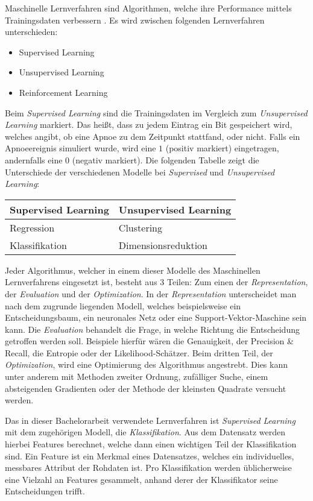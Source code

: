 Maschinelle Lernverfahren sind Algorithmen, welche ihre Performance mittels Trainingsdaten verbessern \cite{neumannMaschineLearningKIT2020}. 
Es wird zwischen folgenden Lernverfahren unterschieden:
\begin{itemize}
    \item Supervised Learning
    \item Unsupervised Learning
    \item Reinforcement Learning
\end{itemize}
Beim \textit{Supervised Learning} sind die Trainingsdaten im Vergleich zum \textit{Unsupervised Learning} markiert.
Das heißt, dass zu jedem Eintrag ein Bit gespeichert wird, welches angibt, ob eine Apnoe zu dem Zeitpunkt stattfand, oder nicht. 
Falls ein Apnoeereignis simuliert wurde, wird eine $1$ ({\glqq positiv markiert\grqq}) eingetragen, andernfalls eine $0$ ({\glqq negativ markiert\grqq}).
Die folgenden Tabelle zeigt die Unterschiede der verschiedenen Modelle bei \textit{Supervised} und \textit{Unsupervised Learning}:
\begin{center}
    \begin{tabular}{ | l | l | }
      \hline
      \textbf{Supervised Learning} & \textbf{Unsupervised Learning} \\ \hline
      \hline
      Regression & Clustering \\ \hline
      Klassifikation & Dimensionsreduktion \\
      \hline
    \end{tabular}
\end{center}

Jeder Algorithmus, welcher in einem dieser Modelle des Maschinellen Lernverfahrens eingesetzt ist, besteht aus 3 Teilen: Zum einen der \textit{Representation}, der \textit{Evaluation} und der \textit{Optimization}. 
In der \textit{Representation} unterscheidet man nach dem zugrunde liegenden Modell, welches beispielsweise ein Entscheidungsbaum, ein neuronales Netz oder eine Support-Vektor-Maschine sein kann.
Die \textit{Evaluation} behandelt die Frage, in welche Richtung die Entscheidung getroffen werden soll. 
Beispiele hierfür wären die Genauigkeit, der Precision \& Recall, die Entropie oder der Likelihood-Schätzer.
Beim dritten Teil, der \textit{Optimization}, wird eine Optimierung des Algorithmus angestrebt. 
Dies kann unter anderem mit Methoden zweiter Ordnung, zufälliger Suche, einem absteigenden Gradienten oder der Methode der kleinsten Quadrate versucht werden.

Das in dieser Bachelorarbeit verwendete Lernverfahren ist \textit{Supervised Learning} mit dem zugehörigen Modell, die \textit{Klassifikation}.
Aus dem Datensatz werden hierbei Features berechnet, welche dann einen wichtigen Teil der Klassifikation sind.
Ein Feature ist ein Merkmal eines Datensatzes, welches ein individuelles, messbares Attribut der Rohdaten ist.
Pro Klassifikation werden üblicherweise eine Vielzahl an Features gesammelt, anhand derer der Klassifikator seine Entscheidungen trifft.

